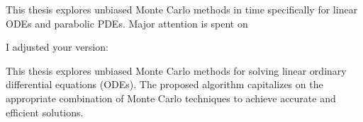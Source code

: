 This thesis explores unbiased Monte Carlo methods in time
specifically for linear ODEs and parabolic PDEs.
Major attention is spent on


I adjusted your version:

This thesis explores unbiased Monte Carlo methods for solving linear
ordinary differential equations (ODEs).
The proposed algorithm
capitalizes on the appropriate combination of Monte Carlo techniques
to achieve accurate and efficient solutions.
